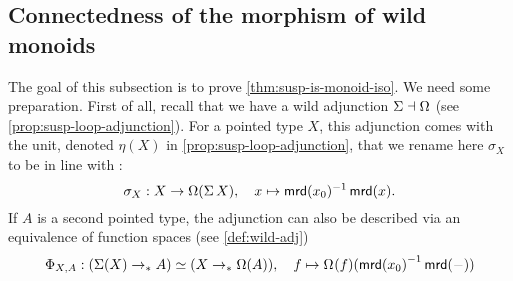 \documentclass[english,a4]{article}
\newcommand{\ptdto}{\to_\ast}%
\begin{document}
\subsection{Connectedness of the morphism of wild monoids}
%
The goal of this subsection is to prove \cref{thm:susp-is-monoid-iso}. We need
some preparation.  First of all, recall that we have a wild adjunction $\operatorname{\Sigma}
\dashv \Omega$ (see \cref{prop:susp-loop-adjunction}).
%
For a pointed type $X$, this adjunction comes with the unit, denoted $\eta(X)$
in \cref{prop:susp-loop-adjunction}, that we rename here $\sigma_X$ to be in line
with \cite{HoTT}:
\begin{equation}  \label{eq:sigma}
  \sigma_X : X \to \Omega(\operatorname{\Sigma} X), \quad x \mapsto \operatorname{\mathsf{mrd}}(x_0)^{-1} \operatorname{\mathsf{mrd}}(x). 
\end{equation}
If $A$ is a second pointed type, the adjunction can also be described via an
equivalence of function spaces (see \cref{def:wild-adj})
\begin{equation}\label{eq:adj-equivalence-susp-loopspace}
  \Phi_{X,A} : (\susp(X) \ptdto A) \simeq (X \ptdto \Omega(A)),\quad
  f \mapsto \loopspace \null (f)(\inv{\mrd (x_0)} \mrd(\blank))
\end{equation}
\end{document}
